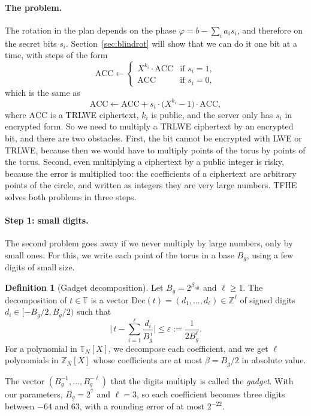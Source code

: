 \documentclass[12pt]{article}
\theoremstyle{plain}
\theoremstyle{definition}
\newtheorem{definition}{Definition}
\newcommand{\T}{\mathbb{T}}
\newcommand{\Z}{\mathbb{Z}}
\newcommand{\TN}{\T_N[X]}
\newcommand{\ZN}{\Z_N[X]}
\newcommand{\Bg}{B_g}
\newcommand{\Dec}{\mathrm{Dec}}
\begin{document}
\paragraph{The problem.}
The rotation in the plan depends on the phase $\varphi=b-\sum_ia_is_i$, and
therefore on the secret bits $s_i$. Section~\ref{sec:blindrot} will show that
we can do it one bit at a time, with steps of the form
\[
  \mathrm{ACC}\gets\begin{cases}X^{k_i}\cdot\mathrm{ACC} & \text{if } s_i=1,\\
                                \mathrm{ACC} & \text{if } s_i=0,\end{cases}
\]
which is the same as
\[
  \mathrm{ACC}\gets\mathrm{ACC}+s_i\cdot\big(X^{k_i}-1\big)\cdot\mathrm{ACC},
\]
where $\mathrm{ACC}$ is a TRLWE ciphertext, $k_i$ is public, and the server only
has $s_i$ in encrypted form. So we need to multiply a TRLWE ciphertext by an
encrypted bit, and there are two obstacles. First, the bit cannot be encrypted
with LWE or TRLWE, because then we would have to multiply points of the torus
by points of the torus. Second, even multiplying a ciphertext by a public
integer is risky, because the error is multiplied too: the coefficients of a
ciphertext are arbitrary points of the circle, and written as integers they are
very large numbers. TFHE solves both problems in three steps.

\paragraph{Step 1: small digits.}
The second problem goes away if we never multiply by large numbers, only by
small ones. For this, we write each point of the torus in a base $\Bg$, using a
few digits of small size.

\begin{definition}[Gadget decomposition]
Let $\Bg=2^{\beta_{\mathrm{bit}}}$ and $\ell\ge1$. The decomposition of
$t\in\T$ is a vector $\Dec(t)=(d_1,\dots,d_\ell)\in\Z^\ell$ of signed digits
$d_i\in[-\Bg/2,\Bg/2)$ such that
\begin{equation}
  \Big|\,t-\sum_{i=1}^{\ell}\frac{d_i}{\Bg^{\,i}}\Big|\le\varepsilon
  :=\frac{1}{2\Bg^{\ell}}.
  \label{eq:gadget}
\end{equation}
For a polynomial in $\TN$, we decompose each coefficient, and we get $\ell$
polynomials in $\ZN$ whose coefficients are at most $\beta=\Bg/2$ in absolute
value.
\end{definition}

The vector $(\Bg^{-1},\dots,\Bg^{-\ell})$ that the digits multiply is called the
\emph{gadget}. With our parameters, $\Bg=2^7$ and $\ell=3$, so each coefficient
becomes three digits between $-64$ and $63$, with a rounding error of at most
$2^{-22}$.
\end{document}
